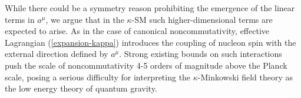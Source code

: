 \documentclass[prl,tightenlines]{revtex4}
\begin{document}
While there could be a symmetry reason prohibiting the emergence of the linear terms in $ a^\mu $, 
we argue that in the $\kappa$-SM such higher-dimensional terms are expected to arise.
As in the case of canonical noncommutativity, effective Lagrangian (\ref{expansion-kappa}) 
introduces the coupling of nucleon spin with the external direction defined by $ a^{\mu} $.
Strong existing bounds on such interactions push the scale of noncommutativity 4-5 orders of 
magnitude above the Planck scale, posing a serious difficulty for interpreting 
the $ \kappa $-Minkowski field theory as the low energy theory of quantum gravity.


\end{document}
